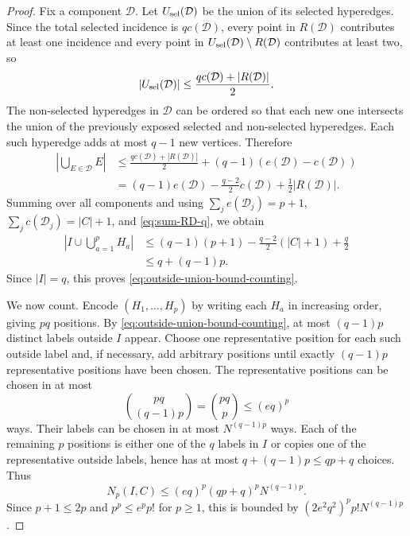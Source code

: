 \documentclass[11pt]{article}
\begin{document}
\begin{proof}
  Fix a component $\mathcal D$.  Let $U_{\rm sel}(\mathcal D)$ be the union of
  its selected hyperedges.  Since the total selected incidence is
  $q c(\mathcal D)$, every point in $R(\mathcal D)$ contributes at least one
  incidence and every point in
  $U_{\rm sel}(\mathcal D)\setminus R(\mathcal D)$ contributes at least two,
  so
  \begin{equation}\label{eq:selected-union-bound}
    |U_{\rm sel}(\mathcal D)|
    \leq
    \frac{q c(\mathcal D)+|R(\mathcal D)|}{2}.
  \end{equation}
  The non-selected hyperedges in $\mathcal D$ can be ordered so that each new
  one intersects the union of the previously exposed selected and non-selected
  hyperedges.  Each such hyperedge adds at most $q-1$ new vertices.  Therefore
  \begin{align}\label{eq:component-union-bound-counting}
    \left|\bigcup_{E\in\mathcal D}E\right|
    &\leq
    \frac{q c(\mathcal D)+|R(\mathcal D)|}{2}
    +(q-1)(e(\mathcal D)-c(\mathcal D)) \\
    &=
    (q-1)e(\mathcal D)
    -\frac{q-2}{2}c(\mathcal D)
    +\frac12|R(\mathcal D)|.
  \end{align}
  Summing over all components and using
  $\sum_j e(\mathcal D_j)=p+1$, $\sum_j c(\mathcal D_j)=|C|+1$, and
  \eqref{eq:sum-RD-q}, we obtain
  \begin{align}\label{eq:total-union-bound-counting}
    \left|I\cup\bigcup_{a=1}^pH_a\right|
    &\leq
    (q-1)(p+1)
    -\frac{q-2}{2}(|C|+1)
    +\frac q2 \\
    &\leq
    q+(q-1)p.
  \end{align}
  Since $|I|=q$, this proves \eqref{eq:outside-union-bound-counting}.

  We now count.  Encode $(H_1,\ldots,H_p)$ by writing each $H_a$ in increasing
  order, giving $pq$ positions.  By
  \eqref{eq:outside-union-bound-counting}, at most $(q-1)p$ distinct labels
  outside $I$ appear.  Choose one representative position for each such outside
  label and, if necessary, add arbitrary positions until exactly $(q-1)p$
  representative positions have been chosen.  The representative positions can
  be chosen in at most
  \begin{equation}\label{eq:representative-position-count}
    \binom{pq}{(q-1)p}
    =
    \binom{pq}{p}
    \leq
    (eq)^p
  \end{equation}
  ways.  Their labels can be chosen in at most $N^{(q-1)p}$ ways.  Each of the
  remaining $p$ positions is either one of the $q$ labels in $I$ or copies one
  of the representative outside labels, hence has at most $q+(q-1)p\leq qp+q$
  choices.  Thus
  \begin{equation}\label{eq:counting-final-before-factorial}
    N_p(I,C)
    \leq
    (eq)^p(qp+q)^p N^{(q-1)p}.
  \end{equation}
  Since $p+1\leq2p$ and $p^p\leq e^p p!$ for $p\geq1$, this is bounded by
  $(2e^2q^2)^p p! N^{(q-1)p}$.
\end{proof}
\end{document}
